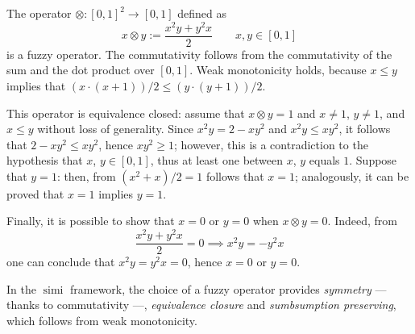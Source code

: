 \documentclass[]{llncs}
\DeclareMathOperator{\simi}{simi}
\begin{document}
  \begin{example}
    The operator \(\otimes \colon {[0,1]}^2 \to [0,1]\) defined as
    \[
    x \otimes y := \frac{x^2y + y^2x}{2} \qquad x,y \in [0,1]
    \]
    is a fuzzy operator.
    The commutativity follows from the commutativity of the sum and the dot product over \([0,1]\). Weak monotonicity holds, because \(x \le y\) implies that \((x \cdot (x+1))/2 \le (y \cdot (y+1))/2\).

    This operator is equivalence closed: assume that \(x \otimes y = 1\) and \(x \ne 1\), \(y \ne 1\), and \(x \le y\) without loss of generality.
    Since \(x^2y = 2 - xy^2\) and \(x^2y \le xy^2\), it follows that \(2-xy^2 \le xy^2\), hence \(xy^2 \ge 1\); however, this is a contradiction to the hypothesis that \(x\), \(y \in [0,1]\), thus at least one between \(x\), \(y\) equals \(1\).
    Suppose that \(y = 1\): then, from \((x^2 + x)/2 = 1\) follows that \(x = 1\); analogously, it can be proved that \(x = 1\) implies \(y = 1\).

    Finally, it is possible to show that \(x = 0\) or \(y = 0\) when \(x \otimes y = 0\).
    Indeed, from
    \[
    \frac{x^2y + y^2x}{2} = 0 \implies x^2y = - y^2x
    \]
    one can conclude that \(x^2y = y^2x = 0\), hence \(x = 0\) or \(y = 0\).
  \end{example}
  In the \(\simi{}\) framework, the choice of a fuzzy operator provides \emph{symmetry} --- thanks to commutativity ---, \emph{equivalence closure} and \emph{sumbsumption preserving}, which follows from weak monotonicity.
\end{document}
